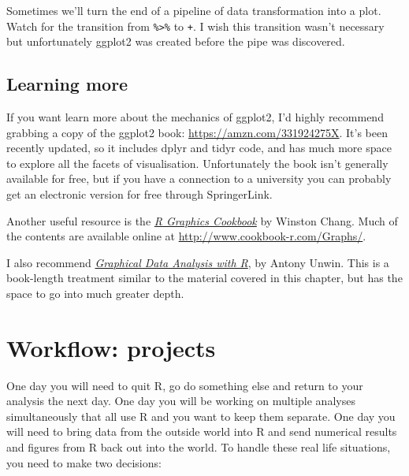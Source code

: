 \documentclass[]{book}
\newenvironment{Shaded}{\begin{snugshade}}{\end{snugshade}}
\newcommand{\KeywordTok}[1]{\textcolor[rgb]{0.13,0.29,0.53}{\textbf{{#1}}}}
\newcommand{\DataTypeTok}[1]{\textcolor[rgb]{0.13,0.29,0.53}{{#1}}}
\newcommand{\StringTok}[1]{\textcolor[rgb]{0.31,0.60,0.02}{{#1}}}
\newcommand{\NormalTok}[1]{{#1}}
\begin{document}
Sometimes we'll turn the end of a pipeline of data transformation into a
plot. Watch for the transition from \texttt{\%\textgreater{}\%} to
\texttt{+}. I wish this transition wasn't necessary but unfortunately
ggplot2 was created before the pipe was discovered.

\begin{Shaded}
\end{Shaded}

\section{Learning more}\label{learning-more}

If you want learn more about the mechanics of ggplot2, I'd highly
recommend grabbing a copy of the ggplot2 book:
\url{https://amzn.com/331924275X}. It's been recently updated, so it
includes dplyr and tidyr code, and has much more space to explore all
the facets of visualisation. Unfortunately the book isn't generally
available for free, but if you have a connection to a university you can
probably get an electronic version for free through SpringerLink.

Another useful resource is the
\href{https://amzn.com/1449316956}{\emph{R Graphics Cookbook}} by
Winston Chang. Much of the contents are available online at
\url{http://www.cookbook-r.com/Graphs/}.

I also recommend \href{https://amzn.com/1498715230}{\emph{Graphical Data
Analysis with R}}, by Antony Unwin. This is a book-length treatment
similar to the material covered in this chapter, but has the space to go
into much greater depth.

\hypertarget{workflow-projects}{\chapter{Workflow:
projects}\label{workflow-projects}}

One day you will need to quit R, go do something else and return to your
analysis the next day. One day you will be working on multiple analyses
simultaneously that all use R and you want to keep them separate. One
day you will need to bring data from the outside world into R and send
numerical results and figures from R back out into the world. To handle
these real life situations, you need to make two decisions:
\end{document}
